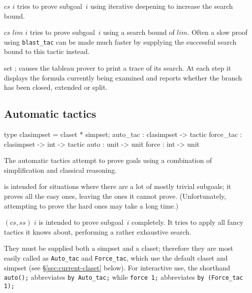 \begin{ttdescription}
\item[\ttindexbold{blast_tac} $cs$ $i$] tries to prove
  subgoal~$i$ using iterative deepening to increase the search bound.
  
\item[\ttindexbold{Blast.depth_tac} $cs$ $lim$ $i$] tries
  to prove subgoal~$i$ using a search bound of $lim$.  Often a slow
  proof using \texttt{blast_tac} can be made much faster by supplying the
  successful search bound to this tactic instead.
  
\item[set \ttindexbold{Blast.trace};] 
  causes the tableau prover to print a trace of its search.  At each step it
  displays the formula currently being examined and reports whether the branch
  has been closed, extended or split.
\end{ttdescription}


\subsection{Automatic tactics}\label{sec:automatic-tactics}
\begin{ttbox} 
type clasimpset = claset * simpset;
auto_tac        : clasimpset ->        tactic
force_tac       : clasimpset -> int -> tactic
auto            : unit -> unit
force           : int  -> unit
\end{ttbox}
The automatic tactics attempt to prove goals using a combination of
simplification and classical reasoning. 
\begin{ttdescription}
\item[\ttindexbold{auto_tac $(cs,ss)$}] is intended for situations where 
there are a lot of mostly trivial subgoals; it proves all the easy ones, 
leaving the ones it cannot prove.
(Unfortunately, attempting to prove the hard ones may take a long time.)  
\item[\ttindexbold{force_tac} $(cs,ss)$ $i$] is intended to prove subgoal~$i$ 
completely. It tries to apply all fancy tactics it knows about, 
performing a rather exhaustive search.
\end{ttdescription}
They must be supplied both a simpset and a claset; therefore 
they are most easily called as \texttt{Auto_tac} and \texttt{Force_tac}, which 
use the default claset and simpset (see \S\ref{sec:current-claset} below). 
For interactive use, 
the shorthand \texttt{auto();} abbreviates \texttt{by Auto_tac;} 
while \texttt{force 1;} abbreviates \texttt{by (Force_tac 1);}


